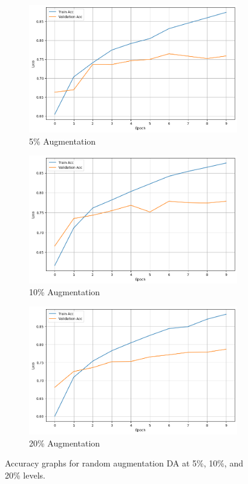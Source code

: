 \documentclass[10pt]{extarticle}
\begin{document}
\begin{figure}[ht]
  \centering
  \begin{subfigure}[b]{0.3\textwidth}
    \includegraphics[width=\textwidth]{img/random_5.png}
    \caption{5\% Augmentation}
    \label{fig:random_5}
  \end{subfigure}
  \hfill
  \begin{subfigure}[b]{0.3\textwidth}
    \includegraphics[width=\textwidth]{img/random_10.png}
    \caption{10\% Augmentation}
    \label{fig:random_10}
  \end{subfigure}
  \hfill
  \begin{subfigure}[b]{0.3\textwidth}
    \includegraphics[width=\textwidth]{img/random_20.png}
    \caption{20\% Augmentation}
    \label{fig:random_20}
  \end{subfigure}
  \caption{Accuracy graphs for random augmentation DA at 5\%, 10\%, and 20\% levels.}
  \label{fig:random_substitution_acc}
\end{figure}
\end{document}
